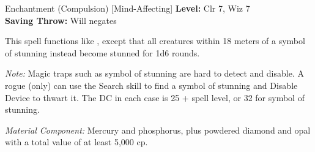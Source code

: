 {Enchantment (Compulsion) [Mind-Affecting]}
{
	\textbf{Level:}
	Clr 7, Wiz 7\\
	\textbf{Saving Throw:}
	Will negates\\
}
{
	This spell functions like , except that all creatures within 18 meters of a symbol of stunning instead become stunned for 1d6 rounds.

	\textit{Note:} Magic traps such as symbol of stunning are hard to detect and disable. A rogue (only) can use the Search skill to find a symbol of stunning and Disable Device to thwart it. The DC in each case is 25 + spell level, or 32 for symbol of stunning.

	\textit{Material Component:}
	Mercury and phosphorus, plus powdered diamond and opal with a total value of at least 5,000 cp.

}
